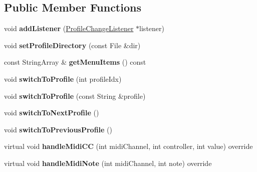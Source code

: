 \subsection*{Public Member Functions}
\begin{DoxyCompactItemize}
\item 
void {\bfseries add\+Listener} (\hyperlink{class_profile_change_listener}{Profile\+Change\+Listener} $\ast$listener)\hypertarget{class_profile_manager_ab10b542da25d23277371cd2103316098}{}\label{class_profile_manager_ab10b542da25d23277371cd2103316098}

\item 
void {\bfseries set\+Profile\+Directory} (const File \&dir)\hypertarget{class_profile_manager_a1529c4a30042187372c455729d917cd5}{}\label{class_profile_manager_a1529c4a30042187372c455729d917cd5}

\item 
const String\+Array \& {\bfseries get\+Menu\+Items} () const \hypertarget{class_profile_manager_a29c905a98315b3f30ec72d542d68fd28}{}\label{class_profile_manager_a29c905a98315b3f30ec72d542d68fd28}

\item 
void {\bfseries switch\+To\+Profile} (int profile\+Idx)\hypertarget{class_profile_manager_a2744c8c215043462fa1805eb489d0232}{}\label{class_profile_manager_a2744c8c215043462fa1805eb489d0232}

\item 
void {\bfseries switch\+To\+Profile} (const String \&profile)\hypertarget{class_profile_manager_a9014037000e5a643c080e42f0c0e250e}{}\label{class_profile_manager_a9014037000e5a643c080e42f0c0e250e}

\item 
void {\bfseries switch\+To\+Next\+Profile} ()\hypertarget{class_profile_manager_a7644e0703d1bdb3172271cec13e86662}{}\label{class_profile_manager_a7644e0703d1bdb3172271cec13e86662}

\item 
void {\bfseries switch\+To\+Previous\+Profile} ()\hypertarget{class_profile_manager_a778eb208053cbcb18a7056b4066632ec}{}\label{class_profile_manager_a778eb208053cbcb18a7056b4066632ec}

\item 
virtual void {\bfseries handle\+Midi\+CC} (int midi\+Channel, int controller, int value) override\hypertarget{class_profile_manager_af96e39d2bbd4b14492698c0ecb39b4e0}{}\label{class_profile_manager_af96e39d2bbd4b14492698c0ecb39b4e0}

\item 
virtual void {\bfseries handle\+Midi\+Note} (int midi\+Channel, int note) override\hypertarget{class_profile_manager_a6515de39866335b7ef722a771767bfb6}{}\label{class_profile_manager_a6515de39866335b7ef722a771767bfb6}


\end{DoxyCompactItemize}
